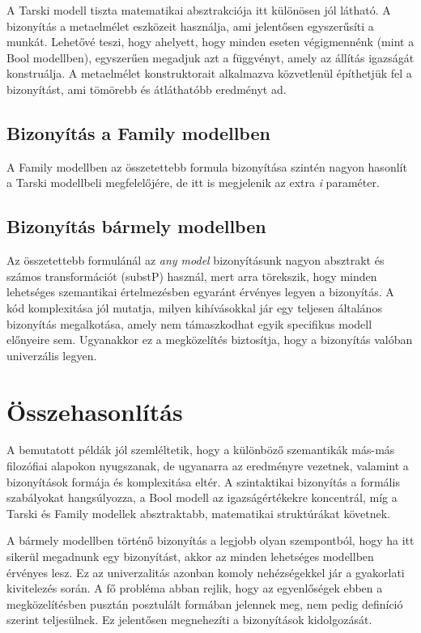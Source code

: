A Tarski modell tiszta matematikai absztrakciója itt különösen jól látható. A bizonyítás a metaelmélet eszközeit használja, ami jelentősen egyszerűsíti a munkát. Lehetővé teszi, hogy ahelyett, hogy minden eseten végigmennénk (mint a Bool modellben), egyszerűen megadjuk azt a függvényt, amely az állítás igazságát konstruálja. A metaelmélet konstruktorait alkalmazva közvetlenül építhetjük fel a bizonyítást, ami tömörebb és átláthatóbb eredményt ad.

\pTarC

\subsection{Bizonyítás a Family modellben}

A Family modellben az összetettebb formula bizonyítása szintén nagyon hasonlít a Tarski modellbeli megfelelőjére, de itt is megjelenik az extra \textit{i} paraméter.

\pFamC

\subsection{Bizonyítás bármely modellben}

Az összetettebb formulánál az \textit{any model} bizonyításunk nagyon absztrakt és számos transformációt (substP) használ, mert arra törekszik, hogy minden lehetséges szemantikai értelmezésben egyaránt érvényes legyen a bizonyítás. A kód komplexitása jól mutatja, milyen kihívásokkal jár egy teljesen általános bizonyítás megalkotása, amely nem támaszkodhat egyik specifikus modell előnyeire sem. Ugyanakkor ez a megközelítés biztosítja, hogy a bizonyítás valóban univerzális legyen.

\pAnyC


\section{Összehasonlítás}

A bemutatott példák jól szemléltetik, hogy a különböző szemantikák más-más filozófiai alapokon nyugszanak, de ugyanarra az eredményre vezetnek, valamint a bizonyítások formája és komplexitása eltér. A szintaktikai bizonyítás a formális szabályokat hangsúlyozza, a Bool modell az igazságértékekre koncentrál, míg a Tarski és Family modellek absztraktabb, matematikai struktúrákat követnek.

A bármely modellben történő bizonyítás a legjobb olyan szempontból, hogy ha itt sikerül megadnunk egy bizonyítást, akkor az minden lehetséges modellben érvényes lesz. Ez az univerzalitás azonban komoly nehézségekkel jár a gyakorlati kivitelezés során. A fő probléma abban rejlik, hogy az egyenlőségek ebben a megközelítésben pusztán posztulált formában jelennek meg, nem pedig definíció szerint teljesülnek. Ez jelentősen megnehezíti a bizonyítások kidolgozását.


